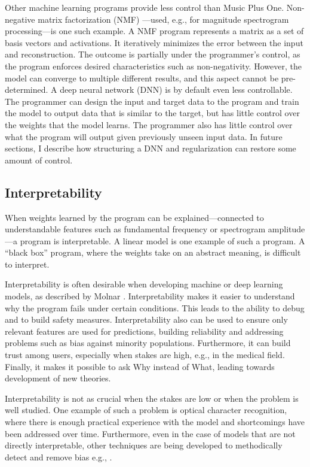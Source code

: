 Other machine learning programs provide less control than Music Plus One. Non-negative matrix factorization (NMF) \cite{LeeDD2000nips}---used, e.g., for magnitude spectrogram processing---is one such example. A NMF program represents a matrix as a set of basis vectors and activations. It iteratively minimizes the error between the input and reconstruction. The outcome is partially under the programmer's control, as the program enforces desired characteristics such as non-negativity. However, the model can converge to multiple different results, and this aspect cannot be pre-determined. A deep neural network (DNN) is by default even less controllable. The programmer can design the input and target data to the program and train the model to output data that is similar to the target, but has little control over the weights that the model learns. The programmer also has little control over what the program will output given previously unseen input data. In future sections, I describe how structuring a DNN and regularization can restore some amount of control. 

\subsection{Interpretability}
\label{sec:interpretability}
When weights learned by the program can be explained---connected to understandable features such as fundamental frequency or spectrogram amplitude---a program is interpretable. A linear model is one example of such a program. A ``black box'' program, where the weights take on an abstract meaning, is difficult to interpret. 

Interpretability is often desirable when developing machine or deep learning models, as described by Molnar \cite{molnar2020interpretable}. Interpretability makes it easier to understand why the program fails under certain conditions. This leads to the ability to debug and to build safety measures. Interpretability also can be used to ensure only relevant features are used for predictions, building reliability and addressing problems such as bias against minority populations. Furthermore, it can build trust among users, especially when stakes are high, e.g., in the medical field. Finally, it makes it possible to ask Why instead of What, leading towards development of new theories. 

Interpretability is not as crucial when the stakes are low or when the problem is well studied. One example of such a problem is optical character recognition, where there is enough practical experience with the model and shortcomings have been addressed over time. Furthermore, even in the case of models that are not directly interpretable, other techniques are being developed to methodically detect and remove bias e.g., \cite{jiang2019identifying}.

